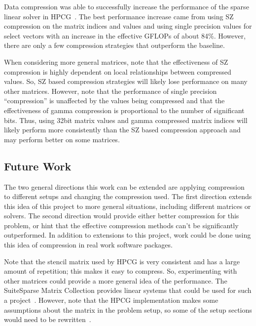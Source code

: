 Data compression was able to successfully increase the performance of the sparse linear solver in HPCG~\cite{Dongarra:2015:HPCG}.
The best performance increase came from using SZ compression on the matrix indices and values and using single precision values for select vectors with an increase in the effective GFLOPs of about 84\%.
However, there are only a few compression strategies that outperform the baseline.

When considering more general matrices, note that the effectiveness of SZ compression is highly dependent on local relationships between compressed values.
So, SZ based compression strategies will likely lose performance on many other matrices.
However, note that the performance of single precision ``compression'' is unaffected by the values being compressed and that the effectiveness of gamma compression is proportional to the number of significant bits.
Thus, using 32bit matrix values and gamma compressed matrix indices will likely perform more consistently than the SZ based compression approach and may perform better on some matrices.

\subsection{Future Work}
The two general directions this work can be extended are applying compression to different setups and changing the compression used.
The first direction extends this idea of this project to more general situations, including different matrices or solvers.
The second direction would provide either better compression for this problem, or hint that the effective compression methods can't be significantly outperformed.
In addition to extensions to this project, work could be done using this idea of compression in real work software packages.

Note that the stencil matrix used by HPCG is very consistent and has a large amount of repetition; this makes it easy to compress.
So, experimenting with other matrices could provide a more general idea of the performance.
The SuiteSparse Matrix Collection provides linear systems that could be used for such a project~\cite{Davis:2011:FloridaMatrixCollection}.
However, note that the HPCG implementation makes some assumptions about the matrix in the problem setup, so some of the setup sections would need to be rewritten~\cite{Dongarra:2015:HPCG}.


